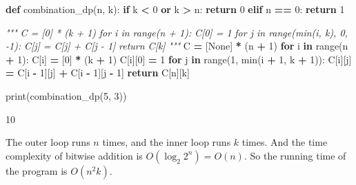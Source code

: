 \documentclass[
]{article}
\newenvironment{Shaded}{\begin{snugshade}}{\end{snugshade}}
\newcommand{\BuiltInTok}[1]{#1}
\newcommand{\CommentTok}[1]{\textcolor[rgb]{0.56,0.35,0.01}{\textit{#1}}}
\newcommand{\ControlFlowTok}[1]{\textcolor[rgb]{0.13,0.29,0.53}{\textbf{#1}}}
\newcommand{\DecValTok}[1]{\textcolor[rgb]{0.00,0.00,0.81}{#1}}
\newcommand{\KeywordTok}[1]{\textcolor[rgb]{0.13,0.29,0.53}{\textbf{#1}}}
\newcommand{\NormalTok}[1]{#1}
\newcommand{\OperatorTok}[1]{\textcolor[rgb]{0.81,0.36,0.00}{\textbf{#1}}}
\newcommand{\VariableTok}[1]{\textcolor[rgb]{0.00,0.00,0.00}{#1}}
\begin{document}
\begin{Shaded}
\begin{Highlighting}[]
\KeywordTok{def}\NormalTok{ combination_dp(n, k):}
    \ControlFlowTok{if}\NormalTok{ k }\OperatorTok{<} \DecValTok{0} \KeywordTok{or}\NormalTok{ k }\OperatorTok{>}\NormalTok{ n:}
        \ControlFlowTok{return} \DecValTok{0}
    \ControlFlowTok{elif}\NormalTok{ n }\OperatorTok{==} \DecValTok{0}\NormalTok{:}
        \ControlFlowTok{return} \DecValTok{1}
  
    \CommentTok{"""}
\CommentTok{    C = [0] * (k + 1)}
\CommentTok{    for i in range(n + 1):}
\CommentTok{        C[0] = 1}
\CommentTok{        for j in range(min(i, k), 0, -1):}
\CommentTok{            C[j] = C[j] + C[j - 1]}
\CommentTok{    return C[k]}
\CommentTok{    """}
\NormalTok{    C }\OperatorTok{=}\NormalTok{ [}\VariableTok{None}\NormalTok{] }\OperatorTok{*}\NormalTok{ (n }\OperatorTok{+} \DecValTok{1}\NormalTok{)}
    \ControlFlowTok{for}\NormalTok{ i }\KeywordTok{in} \BuiltInTok{range}\NormalTok{(n }\OperatorTok{+} \DecValTok{1}\NormalTok{):}
\NormalTok{        C[i] }\OperatorTok{=}\NormalTok{ [}\DecValTok{0}\NormalTok{] }\OperatorTok{*}\NormalTok{ (k }\OperatorTok{+} \DecValTok{1}\NormalTok{)}
\NormalTok{        C[i][}\DecValTok{0}\NormalTok{] }\OperatorTok{=} \DecValTok{1}
        \ControlFlowTok{for}\NormalTok{ j }\KeywordTok{in} \BuiltInTok{range}\NormalTok{(}\DecValTok{1}\NormalTok{, }\BuiltInTok{min}\NormalTok{(i }\OperatorTok{+} \DecValTok{1}\NormalTok{, k }\OperatorTok{+} \DecValTok{1}\NormalTok{)):}
\NormalTok{            C[i][j] }\OperatorTok{=}\NormalTok{ C[i }\OperatorTok{-} \DecValTok{1}\NormalTok{][j] }\OperatorTok{+}\NormalTok{ C[i }\OperatorTok{-} \DecValTok{1}\NormalTok{][j }\OperatorTok{-} \DecValTok{1}\NormalTok{]}
    \ControlFlowTok{return}\NormalTok{ C[n][k]}
  
  
\BuiltInTok{print}\NormalTok{(combination_dp(}\DecValTok{5}\NormalTok{, }\DecValTok{3}\NormalTok{))}
  
\end{Highlighting}
\end{Shaded}

\begin{Shaded}
\begin{Highlighting}[]
\NormalTok{10}
\end{Highlighting}
\end{Shaded}

The outer loop runs \(n\) times, and the inner loop runs \(k\) times.
And the time complexity of bitwise addition is \(O({\log_2 2^n})=O(n)\).
So the running time of the program is \(O(n^2k)\).
\end{document}
